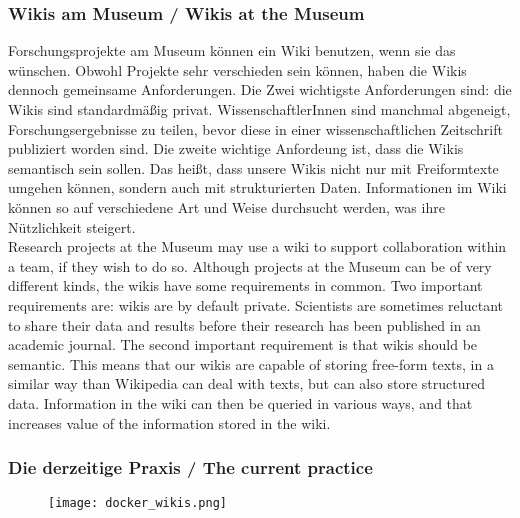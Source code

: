 {\scriptsize
\begin{frame}
  \frametitle{Wikis am Museum / \textcolor{mfn_green}{Wikis at the Museum}}
Forschungsprojekte am Museum können ein Wiki benutzen, wenn sie das wünschen. Obwohl Projekte sehr verschieden sein können, haben die Wikis dennoch gemeinsame Anforderungen. Die Zwei wichtigste Anforderungen sind: die Wikis sind standardmäßig privat. WissenschaftlerInnen sind manchmal abgeneigt, Forschungsergebnisse zu teilen, bevor diese in einer wissenschaftlichen Zeitschrift publiziert worden sind. Die zweite wichtige Anfordeung ist, dass die Wikis semantisch sein sollen. Das heißt, dass unsere Wikis nicht nur mit Freiformtexte umgehen können, sondern auch mit strukturierten Daten. Informationen im Wiki können so auf verschiedene Art und Weise durchsucht werden, was ihre Nützlichkeit steigert.\\
  \bigskip
  \textcolor{mfn_green}{Research projects at the Museum may use a wiki to support collaboration within a team, if they wish to do so. Although projects at the Museum can be of very different kinds, the wikis have some requirements in common. Two important requirements are: wikis are by default private. Scientists are sometimes reluctant to share their data and results before their research has been published in an academic journal. The second important requirement is that wikis should be semantic. This means that our wikis are capable of storing free-form texts, in a similar way than Wikipedia can deal with texts, but can also store structured data. Information in the wiki can then be queried in various ways, and that increases value of the information stored in the wiki.}
\end{frame}
}
\begin{frame}
  \frametitle{Die derzeitige Praxis / \textcolor{mfn_green}{The current practice}}
  \begin{figure}
    \texttt{[image: docker\_wikis.png]}
  \end{figure}
\end{frame}


